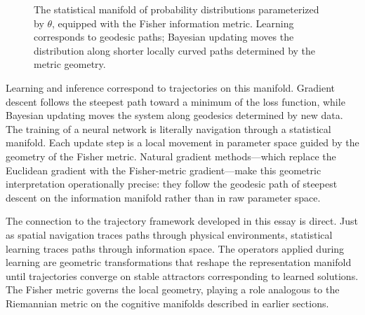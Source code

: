 \documentclass[11pt, a4paper]{article}
\theoremstyle{plain}
\theoremstyle{definition}
\theoremstyle{remark}
\begin{document}
\begin{figure}[h]
\centering
{}
\caption{The statistical manifold of probability distributions parameterized by
$\theta$, equipped with the Fisher information metric. Learning corresponds to
geodesic paths; Bayesian updating moves the distribution along shorter locally
curved paths determined by the metric geometry.}
\end{figure}

Learning and inference correspond to trajectories on this manifold. Gradient descent
follows the steepest path toward a minimum of the loss function, while Bayesian updating
moves the system along geodesics determined by new data. The training of a neural network
is literally navigation through a statistical manifold. Each update step is a local
movement in parameter space guided by the geometry of the Fisher metric. Natural gradient
methods---which replace the Euclidean gradient with the Fisher-metric gradient---make
this geometric interpretation operationally precise: they follow the geodesic path of
steepest descent on the information manifold rather than in raw parameter space.

The connection to the trajectory framework developed in this essay is direct. Just as
spatial navigation traces paths through physical environments, statistical learning
traces paths through information space. The operators applied during learning are
geometric transformations that reshape the representation manifold until trajectories
converge on stable attractors corresponding to learned solutions. The Fisher metric
governs the local geometry, playing a role analogous to the Riemannian metric on the
cognitive manifolds described in earlier sections.
\end{document}
